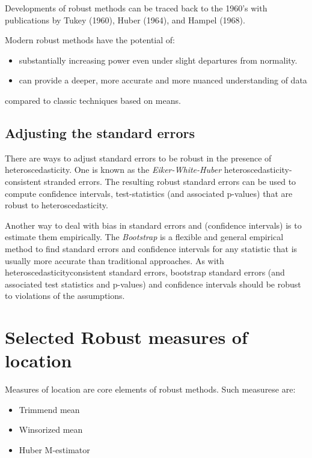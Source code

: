 \documentclass[
]{article}
\providecommand{\tightlist}{%
  \setlength{\itemsep}{0pt}\setlength{\parskip}{0pt}}
\begin{document}
Developments of robust methods can be traced back to the 1960's with publications by Tukey (1960), Huber (1964), and Hampel (1968).

Modern robust methods have the potential of:

\begin{itemize}
\tightlist
\item
  substantially increasing power even under slight departures from normality.
\item
  can provide a deeper, more accurate and more nuanced understanding of data
\end{itemize}

compared to classic techniques based on means.

\subsection*{Adjusting the standard errors}\label{adjusting-the-standard-errors}

There are ways to adjust standard errors to be robust in the presence of heteroscedasticity. One is known as the \emph{Eiker-White-Huber} heteroscedasticity-consistent stranded errors. The resulting robust standard errors can be used to compute confidence intervals, test-statistics (and associated p-values) that are robust to heteroscedasticity.

Another way to deal with bias in standard errors and (confidence intervals) is to estimate them empirically. The \emph{Bootstrap} is a flexible and general empirical method to find standard errors and confidence intervals for any statistic that is usually more accurate than traditional approaches. As with heteroscedasticityconsistent standard errors, bootstrap standard errors (and associated test statistics and p-values) and confidence intervals should be robust to violations of the assumptions.

\section*{Selected Robust measures of location}\label{selected-robust-measures-of-location}

Measures of location are core elements of robust methods. Such measurese are:

\begin{itemize}
\tightlist
\item
  Trimmend mean
\item
  Winsorized mean
\item
  Huber M-estimator
\end{itemize}
\end{document}
